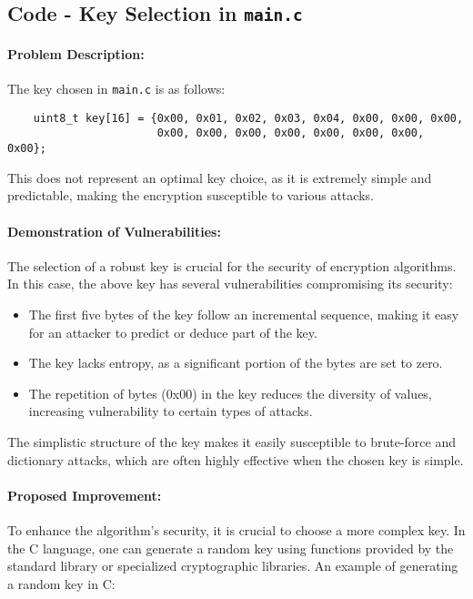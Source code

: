 \documentclass[12pt]{article}
\begin{document}
\subsection{Code - Key Selection in \texttt{main.c}}

    \paragraph{Problem Description:}
    The key chosen in \texttt{main.c} is as follows:
    \begin{verbatim}
    uint8_t key[16] = {0x00, 0x01, 0x02, 0x03, 0x04, 0x00, 0x00, 0x00,
                       0x00, 0x00, 0x00, 0x00, 0x00, 0x00, 0x00, 0x00};
    \end{verbatim}
    This does not represent an optimal key choice, as it is extremely simple and predictable, making the encryption susceptible to various attacks.
    
    \paragraph{Demonstration of Vulnerabilities:}
    The selection of a robust key is crucial for the security of encryption algorithms. In this case, the above key has several vulnerabilities compromising its security:
    \begin{itemize}
        \item The first five bytes of the key follow an incremental sequence, making it easy for an attacker to predict or deduce part of the key.
        \item The key lacks entropy, as a significant portion of the bytes are set to zero.
        \item The repetition of bytes (0x00) in the key reduces the diversity of values, increasing vulnerability to certain types of attacks.
    \end{itemize}
    The simplistic structure of the key makes it easily susceptible to brute-force and dictionary attacks, which are often highly effective when the chosen key is simple.
    
    \paragraph{Proposed Improvement:}
    To enhance the algorithm's security, it is crucial to choose a more complex key. In the C language, one can generate a random key using functions provided by the standard library or specialized cryptographic libraries. An example of generating a random key in C:
    
\end{document}
